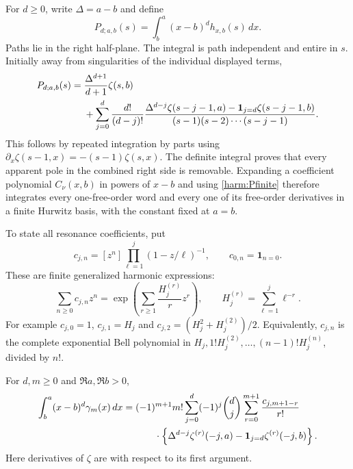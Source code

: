 For $d\ge0$, write $\Delta=a-b$ and define
\begin{equation}
 P_{d;a,b}(s)=\int_b^a(x-b)^d h_{x,b}(s)\,dx.
 \label{harm:Pdef}
\end{equation}
Paths lie in the right half-plane. The integral is path independent and
entire in $s$. Initially away from singularities of the individual
displayed terms,
\begin{align}
 P_{d;a,b}(s)
  ={}&\frac{\Delta^{d+1}}{d+1}\zeta(s,b)\notag\\
   &+\sum_{j=0}^d\frac{d!}{(d-j)!}
     \frac{\Delta^{d-j}\zeta(s-j-1,a)
              -\mathbf1_{j=d}\zeta(s-j-1,b)}
          {(s-1)(s-2)\cdots(s-j-1)}.
 \label{harm:Pfinite}
\end{align}
This follows by repeated integration by parts using
$\partial_x\zeta(s-1,x)=-(s-1)\zeta(s,x)$.
The definite integral proves that every apparent pole in the combined
right side is removable. Expanding a coefficient polynomial
$C_\nu(x,b)$ in powers of $x-b$ and using \eqref{harm:Pfinite}
therefore integrates every one-free-order word and every one of its
free-order derivatives in a finite Hurwitz basis, with the constant
fixed at $a=b$.

To state all resonance coefficients, put
\begin{equation}
 c_{j,n}=[z^n]\prod_{\ell=1}^j(1-z/\ell)^{-1},
 \qquad c_{0,n}=\mathbf1_{n=0}.
 \label{harm:cn}
\end{equation}
These are finite generalized harmonic expressions:
\[
 \sum_{n\ge0}c_{j,n}z^n
     =\exp\left(\sum_{r\ge1}\frac{H_j^{(r)}}r z^r\right),
 \qquad H_j^{(r)}=\sum_{\ell=1}^j\ell^{-r}.
\]
For example $c_{j,0}=1$, $c_{j,1}=H_j$ and
$c_{j,2}=(H_j^2+H_j^{(2)})/2$. Equivalently, $c_{j,n}$ is the
complete exponential Bell polynomial in
$H_j,1!H_j^{(2)},\ldots,(n-1)!H_j^{(n)}$, divided by $n!$.

\begin{corollary}
\label{harm:Stieltjesmoments}
For $d,m\ge0$ and $\Re a,\Re b>0$,
\begin{align}
 \int_b^a(x-b)^d\gamma_m(x)\,dx
   ={}&(-1)^{m+1}m!
        \sum_{j=0}^d(-1)^j\binom dj
        \sum_{r=0}^{m+1}\frac{c_{j,m+1-r}}{r!}\notag\\
      &\hspace{7mm}\cdot
       \left\{\Delta^{d-j}\zeta^{(r)}(-j,a)
                      -\mathbf1_{j=d}\zeta^{(r)}(-j,b)\right\}.
 \label{harm:Stieltjesfinite}
\end{align}
Here derivatives of $\zeta$ are with respect to its first argument.
\end{corollary}

